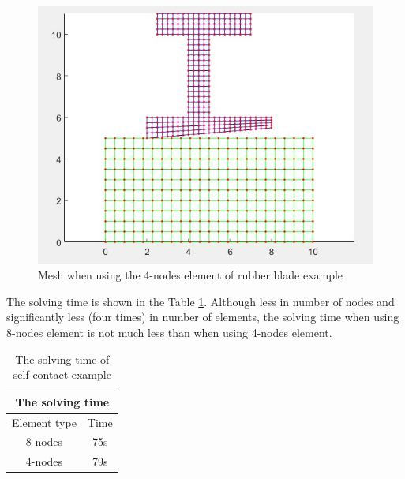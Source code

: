 \begin{figure}[H]
    \centering
    \includegraphics[scale=0.85]{Figures/chapter5/q4_mesh_r.jpg}
    \decoRule
    \caption{Mesh when using the 4-nodes element of rubber blade example}
    \label{fig:q4_mesh_r}
\end{figure}

\begin{table}[H]
    \centering
    \caption{Mesh properties of rubber blade example}
    \label{tab:mp_r}
\end{table}
\noindent
The solving time is shown in the Table \ref{tab:st_r}.
Although less in number of nodes and significantly less (four times) in number of elements, the solving time when using 8-nodes element is not much less than when using 4-nodes element.
\begin{table}[H]
    \centering
    \begin{tabular}{|c|c|}
    \multicolumn{2}{c}{The solving time} \\ \hline
         Element type & Time \\ \hline 
         8-nodes           & 75s \\ \hline
         4-nodes           & 79s \\ \hline
    \end{tabular}
    \caption{The solving time of self-contact example}
    \label{tab:st_r}
\end{table}
\newpage
